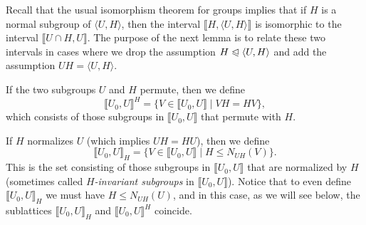 \documentclass{gen-j-l}
\newcommand{\lb}{\ensuremath{\llbracket}}
\newcommand{\rb}{\ensuremath{\rrbracket}}
\newcommand{\<}{\ensuremath{\langle}}
\renewcommand{\>}{\ensuremath{\rangle}}
\theoremstyle{plain}
\theoremstyle{definition}
\theoremstyle{remark}
\numberwithin{theorem}{section}
\numberwithin{claim}{section}
\numberwithin{equation}{section}
\numberwithin{conjecture}{section}
\renewcommand{\leq}{\ensuremath{\leqslant}}
\newcommand{\subnormal}{\ensuremath{\trianglelefteqslant}}
\newcommand{\2}{\ensuremath{\mathbf{2}}}
\newcommand{\3}{\ensuremath{\mathbf{3}}}
\begin{document}
Recall that the usual isomorphism theorem for groups implies
that 
if $H$ is a normal subgroup of $\<U, H\>$, 
then the interval
$\lb H, \<U, H\> \rb$ is isomorphic to the interval $\lb U\cap H, U \rb$.  The 
purpose of the next lemma is to relate these two
intervals in cases where we drop the assumption $H\subnormal \<U,H\>$
and add the assumption $UH = \<U,H\>$.

If the two subgroups $U$ and $H$ permute, then we define 
\begin{equation}
  \label{eq:dedekind-1}
\lb U_0, U \rb^H = \{ V\in \lb U_0,U \rb \mid VH = HV\},
\end{equation}
which consists of those subgroups in $\lb U_0, U \rb$ that permute with
$H$. 

If $H$ normalizes $U$ (which implies $UH=HU$), 
then we %
define
\begin{equation}
  \label{eq:dedekind-2}
\lb U_0, U \rb_H = \{ V\in \lb U_0,U \rb \mid H\leq N_{UH}(V)\}.
\end{equation}
This is the set consisting of those subgroups in $\lb U_0, U \rb$ that
are normalized by $H$ (sometimes called 
\emph{$H$-invariant subgroups} in $\lb U_0,U \rb$).
Notice that to even
define $\lb U_0, U \rb_H$ we must have $H\leq N_{UH}(U)$, and in this case, as we will
see below, the sublattices 
$\lb U_0, U \rb_H$ and $\lb U_0, U \rb^H$ coincide.
\end{document}
